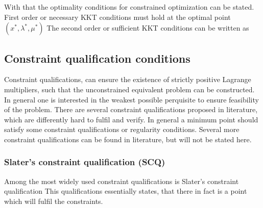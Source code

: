    With that the optimality conditions for constrained optimization can be stated. 
    First order or necessary KKT conditions must hold at the optimal point $(x^{\ast}, \lambda^{\ast}, \mu^{\ast})$
    The second order or sufficient KKT conditions can be written as 

    \subsection{Constraint qualification conditions}
    \label{sec:opt:theory:cq}

    Constraint qualifications, can ensure the existence of strictly positive Lagrange
    multipliers, such that the unconstrained equivalent problem can be constructed. In general one is interested
    in the weakest possible perquisite to ensure feasibility  of the problem.
    There are several constraint qualifications proposed in literature, which are differently hard to fulfil
    and verify. In general a minimum point should satisfy some constraint qualifications or regularity conditions. 
    Several more constraint qualifications can be found in literature, but will not be stated here. 
    
    \subsubsection{Slater's constraint qualification (SCQ)}
    Among the most widely used constraint qualifications is Slater's constraint qualification
    This qualifications essentially states, that there in fact is a point which will fulfil the constraints.

